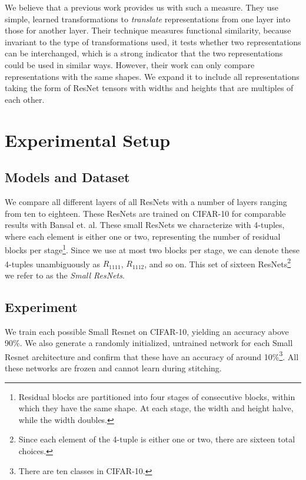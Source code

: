 \documentclass{article} %
\begin{document}
We believe that a previous work \cite{Bansal2021RevisitingMS} provides us with such a measure. They
use simple, learned transformations to \textit{translate} representations from one layer into those for another
layer. Their technique measures functional similarity, because invariant to the type of transformations used,
it tests whether two representations can be interchanged, which is a strong indicator that the two representations
could be used in similar ways. However, their work can only
compare representations with the same shapes.
We expand it to include all representations taking the form of
ResNet tensors with widths and heights that are multiples of each other.
\section{Experimental Setup}
\label{ExperimentalSetup}
\subsection*{Models and Dataset}

We compare all different\cite{https://doi.org/10.48550/arxiv.1803.03635}
layers of all ResNets with a number of layers ranging from ten to eighteen.
These ResNets are trained on CIFAR-10 for comparable results
with Bansal et. al. These small ResNets we characterize with 4-tuples, where 
each element is either one or two, representing the number of residual blocks per stage\footnote{
   Residual blocks are partitioned into four stages of consecutive blocks, within which they have the same shape. At each stage, the
   width and height halve, while the width doubles.
}. Since we use at most two blocks per stage, we can denote these 4-tuples unambiguously as
$R_{1111}$, $R_{1112}$, and so on. This set of sixteen ResNets\footnote{
   Since each element of the 4-tuple is either one or two, there are sixteen total choices.
} we refer to as the \textit{Small ResNets}.

\subsection*{Experiment}
We train each possible Small Resnet on CIFAR-10, yielding an accuracy above 90\%. We also
generate a randomly initialized, untrained network for each Small Resnet architecture and confirm
that these have an accuracy of around 10\%\footnote{There are ten classes in CIFAR-10.}. All these
networks are frozen and cannot learn during stitching.
\end{document}
